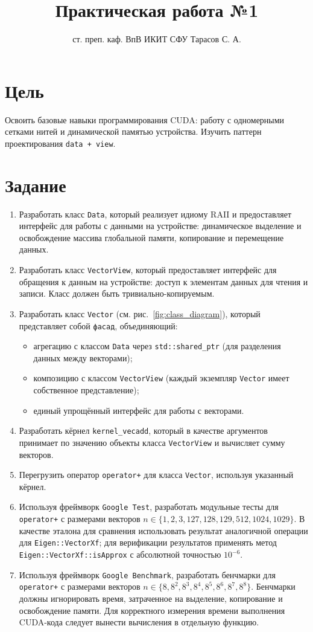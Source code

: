 \documentclass[12pt]{article}
\title{Практическая работа №1}
\author{ст. преп. каф. ВпВ ИКИТ СФУ Тарасов С. А.}
\date{}
\begin{document}
\maketitle

\section*{Цель}
Освоить базовые навыки программирования CUDA: работу с одномерными сетками нитей и динамической памятью устройства. Изучить паттерн проектирования \texttt{data + view}.

\section*{Задание}
\begin{enumerate}
    \item Разработать класс \texttt{Data}, который реализует идиому RAII и предоставляет интерфейс для работы с данными на устройстве: динамическое выделение и освобождение массива глобальной памяти, копирование и перемещение данных.
    \item Разработать класс \texttt{VectorView}, который предоставляет интерфейс для обращения к данным на устройстве: доступ к элементам данных для чтения и записи. Класс должен быть тривиально-копируемым.
    \item Разработать класс \texttt{Vector} (см. рис.~\ref{fig:class_diagram}), который представляет собой \texttt{фасад}, объединяющий:
    \begin{itemize}
        \item агрегацию с классом \texttt{Data} через \texttt{std::shared\_ptr} (для разделения данных между векторами);
        \item композицию с классом \texttt{VectorView} (каждый экземпляр \texttt{Vector} имеет собственное представление);
        \item единый упрощённый интерфейс для работы с векторами.
    \end{itemize}
    \item Разработать кёрнел \texttt{kernel\_vecadd}, который в качестве аргументов принимает по значению объекты класса \texttt{VectorView} и вычисляет сумму векторов.
    \item Перегрузить оператор \texttt{operator+} для класса \texttt{Vector}, используя указанный кёрнел.
    \item Используя фреймворк \texttt{Google Test}, разработать модульные тесты для \texttt{operator+} с размерами векторов $n \in \{1, 2, 3, 127, 128, 129, 512, 1024, 1029\}$. В качестве эталона для сравнения использовать результат аналогичной операции для \texttt{Eigen::VectorXf}; для верификации результатов применять метод \texttt{Eigen::VectorXf::isApprox} с абсолютной точностью $10^{-6}$.
    \item Используя фреймворк \texttt{Google Benchmark}, разработать бенчмарки для \texttt{operator+} с размерами векторов $n \in \{8, 8^2, 8^3, 8^4, 8^5, 8^6, 8^7, 8^8\}$. Бенчмарки должны игнорировать время, затраченное на выделение, копирование и освобождение памяти. Для корректного измерения времени выполнения CUDA-кода следует вынести вычисления в отдельную функцию.


\end{enumerate}
\end{document}
